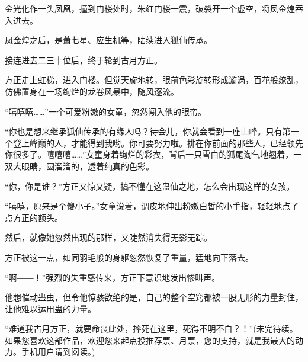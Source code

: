 \begin{this_body}
金光化作一头凤凰，撞到门楼处时，朱红门楼一震，破裂开一个虚空，将凤金煌吞入进去。

凤金煌之后，是萧七星、应生机等，陆续进入狐仙传承。

接连进去二三十位后，终于轮到古月方正。

方正走上虹梯，进入门楼。但觉天旋地转，眼前色彩旋转形成漩涡，百花般缭乱，仿佛置身在一场绚烂的龙卷风暴中，随风逐流。

“嘻嘻嘻……”一个可爱粉嫩的女童，忽然闯入他的眼帘。

“你也是想来继承狐仙传承的有缘人吗？待会儿，你就会看到一座山峰。只有第一个登上峰巅的人，才能得到我哟。你可要努力啦。排在你前面的那些人，已经领先你很多了。嘻嘻嘻……”女童身着绚烂的彩衣，背后一只雪白的狐尾淘气地翘着，一双大眼睛，圆溜溜的，透着纯真的色彩。

“你，你是谁？”方正又惊又疑，搞不懂在这蛊仙之地，怎么会出现这样的女孩。

“嘻嘻，原来是个傻小子。”女童说着，调皮地伸出粉嫩白皙的小手指，轻轻地点了点方正的额头。

然后，就像她忽然出现的那样，又陡然消失得无影无踪。

方正被这一点，如同羽毛般的身躯忽然恢复了重量，猛地向下落去。

“啊――！”强烈的失重感传来，方正下意识地发出惨叫声。

他想催动蛊虫，但令他惊骇欲绝的是，自己的整个空窍都被一股无形的力量封住，让他难以运用蛊的力量。

“难道我古月方正，就要命丧此处，摔死在这里，死得不明不白？！”(未完待续。如果您喜欢这部作品，欢迎您来起点投推荐票、月票，您的支持，就是我最大的动力。手机用户请到阅读。)

\end{this_body}

